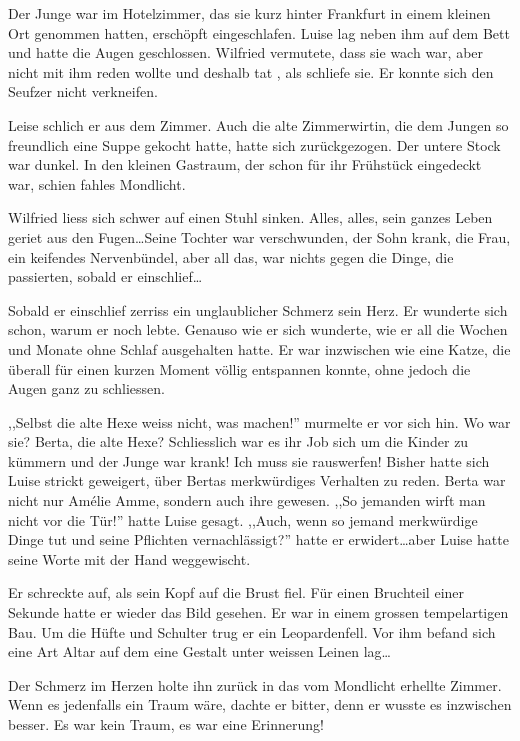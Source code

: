 \documentclass[11pt,titlepage,a5paper]{book}
\newcommand{\am}{Amélie }
\begin{document}
Der Junge war im Hotelzimmer, das sie kurz hinter Frankfurt in einem kleinen Ort genommen hatten, erschöpft eingeschlafen. Luise lag neben ihm auf dem Bett und hatte die Augen geschlossen. Wilfried vermutete, dass sie wach war, aber nicht mit ihm reden wollte und deshalb tat , als schliefe sie. Er konnte sich den Seufzer nicht verkneifen.

Leise schlich er aus dem Zimmer. Auch die alte Zimmerwirtin, die dem Jungen so freundlich eine Suppe gekocht hatte, hatte sich zurückgezogen. Der untere Stock war dunkel. In den kleinen Gastraum, der schon für ihr Frühstück eingedeckt war, schien fahles Mondlicht.

Wilfried liess sich schwer auf einen Stuhl sinken. Alles, alles, sein ganzes Leben geriet aus den Fugen\dots Seine Tochter war verschwunden, der Sohn krank, die Frau, ein keifendes Nervenbündel, aber all das, war nichts gegen die Dinge, die passierten, sobald er einschlief\dots

Sobald er einschlief zerriss ein unglaublicher Schmerz sein Herz. Er wunderte sich schon, warum er noch lebte. Genauso wie er sich wunderte, wie er all die Wochen und Monate ohne Schlaf ausgehalten hatte. Er war inzwischen wie eine Katze, die überall für einen kurzen Moment völlig entspannen konnte, ohne jedoch die Augen ganz zu schliessen. 

,,Selbst die alte Hexe weiss nicht, was machen!'' murmelte er vor sich hin. Wo war sie? Berta, die alte Hexe? Schliesslich war es ihr Job sich um die Kinder zu kümmern und der Junge war krank! Ich muss sie rauswerfen! Bisher hatte sich Luise strickt geweigert, über Bertas merkwürdiges Verhalten zu reden. Berta war nicht nur \am Amme, sondern auch ihre gewesen. ,,So jemanden wirft man nicht vor die Tür!'' hatte Luise gesagt. ,,Auch, wenn so jemand merkwürdige Dinge tut und seine Pflichten vernachlässigt?'' hatte er erwidert\dots aber Luise hatte seine Worte mit der Hand weggewischt.

Er schreckte auf, als sein Kopf auf die Brust fiel. Für einen Bruchteil einer Sekunde hatte er wieder das Bild gesehen. Er war in einem grossen tempelartigen Bau. Um die Hüfte und Schulter trug er ein Leopardenfell. Vor ihm befand sich eine Art Altar auf dem eine Gestalt unter weissen Leinen lag\dots 

Der Schmerz im Herzen holte ihn zurück in das vom Mondlicht erhellte Zimmer. Wenn es jedenfalls ein Traum wäre, dachte er bitter, denn er wusste es inzwischen besser. Es war kein Traum, es war eine Erinnerung!
\end{document}

